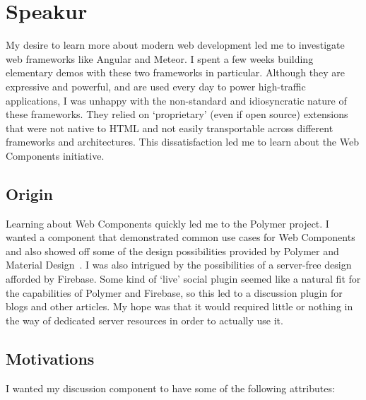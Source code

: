 \section{Speakur}
My desire to learn more about modern web development led me to investigate web frameworks like Angular and Meteor.
I spent a few weeks building elementary demos with these two frameworks in particular.
Although they are expressive and powerful, and are used every day to power high-traffic applications, 
I was unhappy with the non-standard and idiosyncratic nature of these frameworks. 
They relied on `proprietary' (even if open source) extensions that were not native to HTML and not easily transportable across different frameworks and architectures.
This dissatisfaction led me to learn about the Web Components initiative.

\subsection{Origin}
Learning about Web Components quickly led me to the Polymer project.
I wanted a component that demonstrated common use cases for Web Components and also showed off some of the design possibilities provided by Polymer and 
Material Design~\cite{imura2015}.
I was also intrigued by the possibilities of a server-free design afforded by Firebase.
Some kind of `live' social plugin seemed like a natural fit for the capabilities of Polymer and Firebase, so this led to a discussion plugin for blogs and other articles.
My hope was that it would required little or nothing in the way of dedicated server resources in order to actually use it. 

\subsection{Motivations}
\label{motivations}
I wanted my discussion component to have some of the following attributes:

